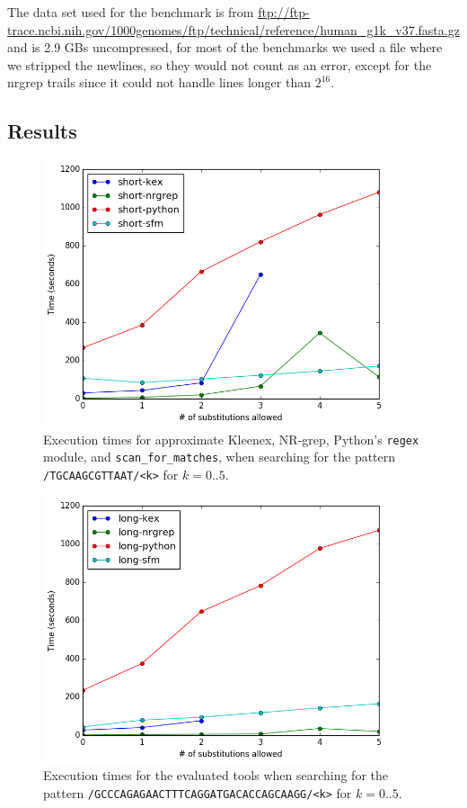 The data set used for the benchmark is from
\url{ftp://ftp-trace.ncbi.nih.gov/1000genomes/ftp/technical/reference/human_g1k_v37.fasta.gz}
and is 2.9 GBs uncompressed, for most of the benchmarks we used a file where we
stripped the newlines, so they would not count as an error, except for the
nrgrep trails since it could not handle lines longer than $2^{16}$.


\subsection{Results}

\begin{figure}[!ht]
  \centering
  \includegraphics[width=0.9\textwidth]{images/short.png}
  \caption{Execution times for approximate Kleenex, NR-grep, Python's
    \texttt{regex} module, and \texttt{scan\_for\_matches}, when searching for
    the pattern \texttt{/TGCAAGCGTTAAT/<k>} for $k=0..5$.}
  \label{fig:short}
\end{figure}

\begin{figure}[!ht]
  \centering
  \includegraphics[width=0.9\textwidth]{images/long.png}
  \caption{Execution times for the evaluated tools when searching for the
    pattern \texttt{/GCCCAGAGAACTTTCAGGATGACACCAGCAAGG/<k>} for $k=0..5$.}
  \label{fig:long}
\end{figure}

